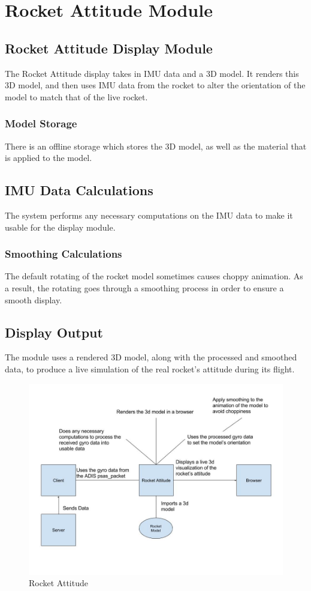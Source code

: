 \section{Rocket Attitude Module}

\subsection{Rocket Attitude Display Module}
The Rocket Attitude display takes in IMU data and a 3D model. It renders this 3D model, and then 
uses IMU data from the rocket to alter the orientation of the model to match that of the live rocket.

\subsubsection{Model Storage}
There is an offline storage which stores the 3D model, as well as the material that is applied to the model.

\subsection{IMU Data Calculations}
The system performs any necessary computations on the IMU data to make it usable for the display module.

\subsubsection{Smoothing Calculations}
The default rotating of the rocket model sometimes causes choppy animation. As a result, the rotating
goes through a smoothing process in order to ensure a smooth display.

\subsection{Display Output}
The module uses a rendered 3D model, along with the processed and smoothed data, to produce a live 
simulation of the real rocket's attitude during its flight.

\begin{figure}[ht!]
\centering
\includegraphics[scale=.4]{imgs/attitude.jpg}
\caption{Rocket Attitude \label{overflow}}
\end{figure}
